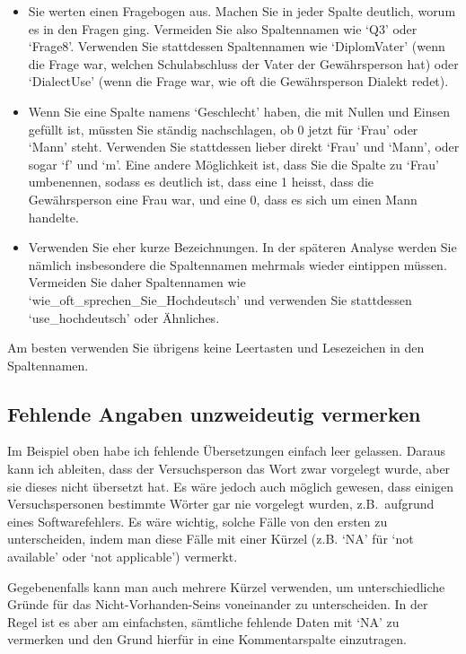 \documentclass[oneside, 10pt]{book}\usepackage[]{graphicx}\usepackage[]{xcolor}
\begin{document}
\begin{itemize}
\item Sie werten einen Fragebogen aus. Machen
Sie in jeder Spalte deutlich, worum es in den Fragen 
ging. Vermeiden Sie also Spaltennamen wie `Q3' oder 
`Frage8'. Verwenden Sie stattdessen Spaltennamen
wie `DiplomVater' (wenn die Frage war, welchen
Schulabschluss der Vater der Gewährsperson hat)
oder `DialectUse' (wenn die Frage war, wie oft
die Gewährsperson Dialekt redet).

\item Wenn Sie eine Spalte namens `Geschlecht' haben,
die mit Nullen und Einsen gefüllt ist, müssten Sie
ständig nachschlagen, ob 0 jetzt für `Frau' oder 
`Mann' steht. Verwenden Sie stattdessen lieber direkt
`Frau' und `Mann', oder sogar `f' und `m'.
Eine andere Möglichkeit ist, dass Sie die Spalte
zu `Frau' umbenennen, sodass es deutlich
ist, dass eine 1 heisst, dass die Gewährsperson
eine Frau war, und eine 0, dass es sich um einen
Mann handelte.

\item Verwenden Sie eher kurze Bezeichnungen.
In der späteren Analyse werden Sie nämlich
insbesondere 
die Spaltennamen mehrmals wieder eintippen müssen.
Vermeiden Sie daher Spaltennamen wie `wie\_oft\_sprechen\_Sie\_Hochdeutsch' und verwenden Sie stattdessen
`use\_hochdeutsch' oder Ähnliches.
\end{itemize}

Am besten verwenden Sie übrigens keine Leertasten
und Lesezeichen in den Spaltennamen.


\subsection{Fehlende Angaben unzweideutig vermerken}
Im Beispiel oben habe ich fehlende Übersetzungen
einfach leer gelassen. Daraus kann ich ableiten,
dass der Versuchsperson das Wort zwar vorgelegt
wurde, aber sie dieses nicht übersetzt hat.
Es wäre jedoch auch möglich gewesen, dass
einigen Versuchspersonen bestimmte Wörter
gar nie vorgelegt wurden, z.B.\
aufgrund eines Softwarefehlers.
Es wäre wichtig, solche Fälle 
von den ersten zu unterscheiden,
indem man diese Fälle mit einer Kürzel (z.B.
`NA' für `not available' oder `not applicable')
vermerkt.

Gegebenenfalls kann man auch mehrere Kürzel
verwenden, um unterschiedliche Gründe für
das Nicht-Vorhanden-Seins voneinander zu unterscheiden.
In der Regel ist es aber am einfachsten, sämtliche
fehlende Daten mit `NA' zu vermerken und
den Grund hierfür in eine Kommentarspalte einzutragen.
\end{document}
